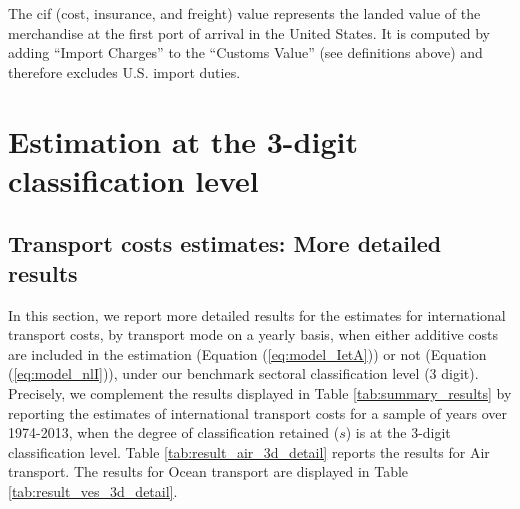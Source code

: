 \documentclass[a4paper,11pt]{article}
\begin{document}
The cif (cost, insurance, and freight) value represents the landed value of the merchandise at the first port of arrival in the United States. It is computed by adding ``Import Charges'' to the ``Customs Value'' (see definitions above) and therefore excludes U.S. import duties.

\section{Estimation at the 3-digit classification level \label{app:more_results}}

\subsection{Transport costs estimates: More detailed results}

In this section, we report more detailed results for the estimates for international transport costs, by transport mode on a yearly basis, when either additive costs are included in the estimation (Equation (\ref{eq:model_IetA})) or not (Equation (\ref{eq:model_nlI})), under our benchmark sectoral classification level (3 digit). Precisely, we complement the results displayed in Table \ref{tab:summary_results} by reporting the estimates of international transport costs for a sample of years over 1974-2013, when the degree of classification retained ($s$) is at the 3-digit classification level. Table \ref{tab:result_air_3d_detail} reports the results for Air transport. The results for Ocean transport are displayed in Table \ref{tab:result_ves_3d_detail}.
\end{document}

